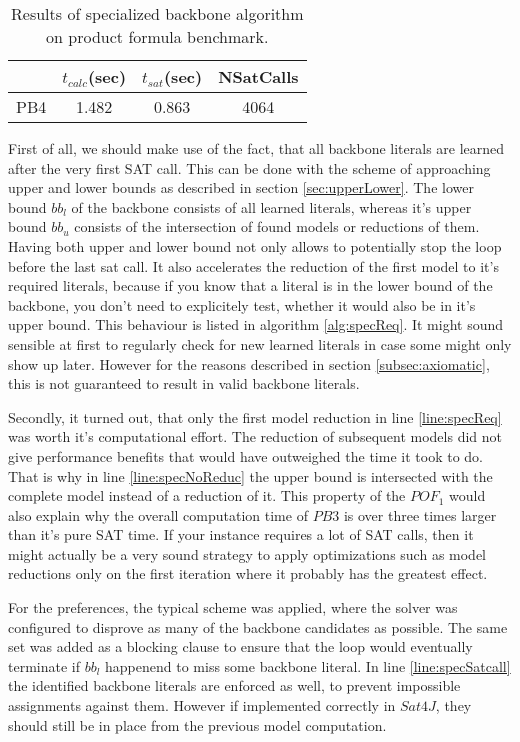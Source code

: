 \begin{wraptable}[7]{r}{8cm}
\begin{tabular}{l| c c c }
&	$t_{calc}$(sec) &	$t_{sat}$(sec)	& NSatCalls \\
\hline
PB4 & 1.482 & 0.863 & 4064 \\
\end{tabular}
\caption{Results of specialized backbone algorithm on product formula benchmark.}
\label{tab:thoreSpecialResults}
\end{wraptable}

First of all, we should make use of the fact, that all backbone literals are learned after the very first SAT call. This can be done with the scheme of approaching upper and lower bounds as described in section \ref{sec:upperLower}. The lower bound $bb_l$ of the backbone consists of all learned literals, whereas it's upper bound $bb_u$ consists of the intersection of found models or reductions of them. Having both upper and lower bound not only allows to potentially stop the loop before the last sat call. It also accelerates the reduction of the first model to it's required literals, because if you know that a literal is in the lower bound of the backbone, you don't need to explicitely test, whether it would also be in it's upper bound. This behaviour is listed in algorithm \ref{alg:specReq}. It might sound sensible at first to regularly check for new learned literals in case some might only show up later. However for the reasons described in section \ref{subsec:axiomatic}, this is not guaranteed to result in valid backbone literals.

Secondly, it turned out, that only the first model reduction in line \ref{line:specReq} was worth it's computational effort. The reduction of subsequent models did not give performance benefits that would have outweighed the time it took to do. That is why in line \ref{line:specNoReduc} the upper bound is intersected with the complete model instead of a reduction of it. This property of the $POF_1$ would also explain why the overall computation time of $PB3$ is over three times larger than it's pure SAT time. If your instance requires a lot of SAT calls, then it might actually be a very sound strategy to apply optimizations such as model reductions only on the first iteration where it probably has the greatest effect. 

For the preferences, the typical scheme was applied, where the solver was configured to disprove as many of the backbone candidates as possible. The same set was added as a blocking clause to ensure that the loop would eventually terminate if $bb_l$ happenend to miss some backbone literal. In line \ref{line:specSatcall} the identified backbone literals are enforced as well, to prevent impossible assignments against them. However if implemented correctly in $Sat4J$, they should still be in place from the previous model computation.


